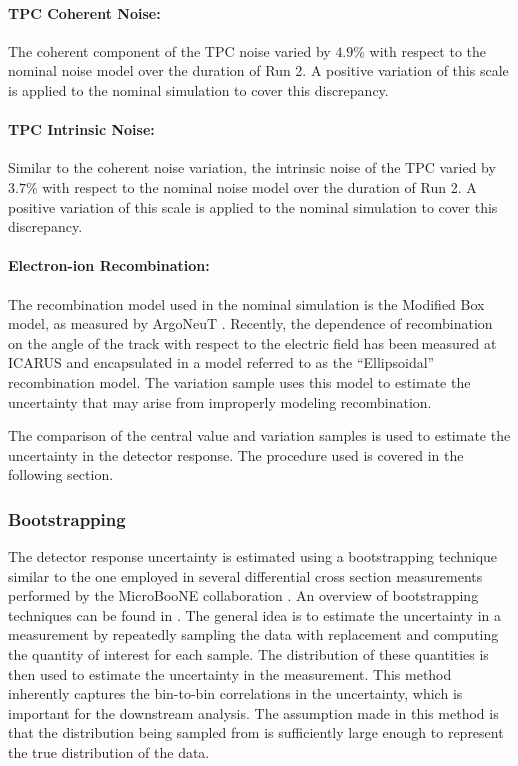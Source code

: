 \paragraph{TPC Coherent Noise:}
The coherent component of the TPC noise varied by $4.9\%$ with respect to the nominal noise model over the duration of Run 2. A positive variation of this scale is applied to the nominal simulation to cover this discrepancy.

\paragraph{TPC Intrinsic Noise:}
Similar to the coherent noise variation, the intrinsic noise of the TPC varied by $3.7\%$ with respect to the nominal noise model over the duration of Run 2. A positive variation of this scale is applied to the nominal simulation to cover this discrepancy.

\paragraph{Electron-ion Recombination:}
The recombination model used in the nominal simulation is the Modified Box model, as measured by ArgoNeuT \cite{Acciarri2013}. Recently, the dependence of recombination on the angle of the track with respect to the electric field has been measured at ICARUS and encapsulated in a model referred to as the ``Ellipsoidal'' recombination model. The variation sample uses this model to estimate the uncertainty that may arise from improperly modeling recombination.

\vspace{\baselineskip}
The comparison of the central value and variation samples is used to estimate the uncertainty in the detector response. The procedure used is covered in the following section.

\subsubsection{Bootstrapping}
\label{sec:bootstrapping}

The detector response uncertainty is estimated using a bootstrapping technique similar to the one employed in several differential cross section measurements performed by the MicroBooNE collaboration \cite{Abratenko2022f,Abratenko2022e,Abratenko2024}. An overview of bootstrapping techniques can be found in \cite{Chernick2011}. The general idea is to estimate the uncertainty in a measurement by repeatedly sampling the data with replacement and computing the quantity of interest for each sample. The distribution of these quantities is then used to estimate the uncertainty in the measurement. This method inherently captures the bin-to-bin correlations in the uncertainty, which is important for the downstream analysis. The assumption made in this method is that the distribution being sampled from is sufficiently large enough to represent the true distribution of the data.

